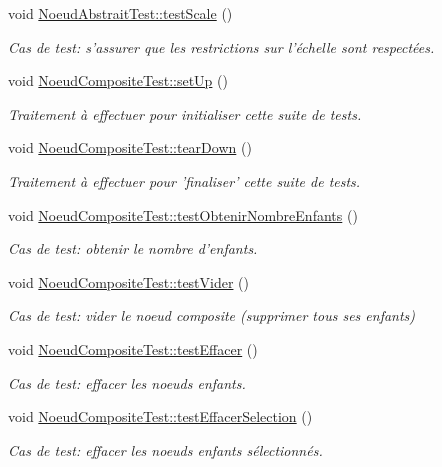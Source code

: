 \begin{DoxyCompactItemize}
void \hyperlink{group__inf2990_gab9182c635c672eb2ade3f2b2b5043244}{Noeud\-Abstrait\-Test\-::test\-Scale} ()
\begin{DoxyCompactList}\small\item\em Cas de test\-: s'assurer que les restrictions sur l'échelle sont respectées. \end{DoxyCompactList}\item 
void \hyperlink{group__inf2990_gac580ba74910c8d4e8476ce2f4e1930a2}{Noeud\-Composite\-Test\-::set\-Up} ()
\begin{DoxyCompactList}\small\item\em Traitement à effectuer pour initialiser cette suite de tests. \end{DoxyCompactList}\item 
void \hyperlink{group__inf2990_gaab8590913d1e0ce48d52ca2875c12c92}{Noeud\-Composite\-Test\-::tear\-Down} ()
\begin{DoxyCompactList}\small\item\em Traitement à effectuer pour 'finaliser' cette suite de tests. \end{DoxyCompactList}\item 
void \hyperlink{group__inf2990_gae6e5ecfa0bfef3aa50bbfe4b082821e9}{Noeud\-Composite\-Test\-::test\-Obtenir\-Nombre\-Enfants} ()
\begin{DoxyCompactList}\small\item\em Cas de test\-: obtenir le nombre d'enfants. \end{DoxyCompactList}\item 
void \hyperlink{group__inf2990_ga5e667d5f1bc2bf30fe013e5a630d95d5}{Noeud\-Composite\-Test\-::test\-Vider} ()
\begin{DoxyCompactList}\small\item\em Cas de test\-: vider le noeud composite (supprimer tous ses enfants) \end{DoxyCompactList}\item 
void \hyperlink{group__inf2990_ga2f7f5a6ba30a148469a30a8c32a8690c}{Noeud\-Composite\-Test\-::test\-Effacer} ()
\begin{DoxyCompactList}\small\item\em Cas de test\-: effacer les noeuds enfants. \end{DoxyCompactList}\item 
void \hyperlink{group__inf2990_ga9dc8155dc795120e1d6abfbbee81161b}{Noeud\-Composite\-Test\-::test\-Effacer\-Selection} ()
\begin{DoxyCompactList}\small\item\em Cas de test\-: effacer les noeuds enfants sélectionnés. \end{DoxyCompactList}\item 

\end{DoxyCompactItemize}
